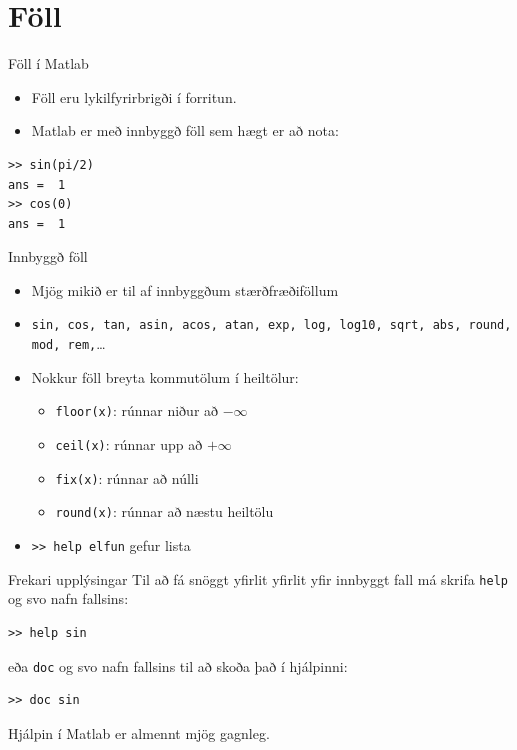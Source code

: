 \documentclass{beamer}
\begin{document}
\section{Föll}

\begin{frame}[fragile]{Föll í Matlab}
\begin{itemize}
 \item Föll eru lykilfyrirbrigði í forritun.
 \item Matlab er með innbyggð föll sem hægt er að nota:
\end{itemize}
\begin{verbatim}
>> sin(pi/2)
ans =  1
>> cos(0)
ans =  1
\end{verbatim}
\end{frame}

\begin{frame}{Innbyggð föll}
\begin{itemize}
 \item Mjög mikið er til af innbyggðum stærðfræðiföllum
 \item \texttt{sin, cos, tan, asin, acos, atan, exp, log, log10, sqrt, abs, round, mod, rem,}\ldots
 \item Nokkur föll breyta kommutölum í heiltölur:
 \begin{itemize}
  \item \texttt{floor(x)}: rúnnar niður að $-\infty$
  \item \texttt{ceil(x)}: rúnnar upp að $+\infty$
  \item \texttt{fix(x)}: rúnnar að núlli
  \item \texttt{round(x)}: rúnnar að næstu heiltölu
 \end{itemize}
 \item \texttt{>> help elfun} gefur lista
\end{itemize}
\end{frame}

\begin{frame}[fragile]{Frekari upplýsingar}
Til að fá snöggt yfirlit yfirlit yfir innbyggt fall má skrifa \texttt{help} og svo nafn fallsins:
\begin{verbatim}
>> help sin
\end{verbatim}
eða \texttt{doc} og svo nafn fallsins til að skoða það í hjálpinni:
\begin{verbatim}
>> doc sin
\end{verbatim}
Hjálpin í Matlab er almennt mjög gagnleg.
\end{frame}
\end{document}
